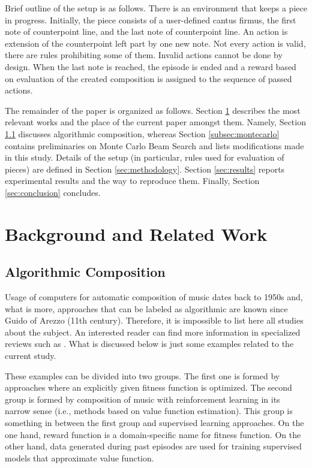 \documentclass{article}
\begin{document}
Brief outline of the setup is as follows. There is an environment that keeps a piece in progress. Initially, the piece consists of a user-defined cantus firmus, the first note of counterpoint line, and the last note of counterpoint line. An action is extension of the counterpoint left part by one new note. Not every action is valid, there are rules prohibiting some of them. Invalid actions cannot be done by design. When the last note is reached, the episode is ended and a reward based on evaluation of the created composition is assigned to the sequence of passed actions.

The remainder of the paper is organized as follows. Section \ref{sec:literature} describes the most relevant works and the place of the current paper amongst them. Namely, Section \ref{subsec:composition} discusses algorithmic composition, whereas Section \ref{subsec:montecarlo} contains preliminaries on Monte Carlo Beam Search and lists modifications made in this study. Details of the setup (in particular, rules used for evaluation of pieces) are defined in Section \ref{sec:methodology}. Section \ref{sec:results} reports experimental results and the way to reproduce them. Finally, Section \ref{sec:conclusion} concludes.


\section{Background and Related Work}
\label{sec:literature}

\subsection{Algorithmic Composition}
\label{subsec:composition}

Usage of computers for automatic composition of music dates back to 1950s and, what is more, approaches that can be labeled as algorithmic are known since Guido of Arezzo (11th century). Therefore, it is impossible to list here all studies about the subject. An interested reader can find more information in specialized reviews such as \cite{fernandez2013ai}. What is discussed below is just some examples related to the current study.

These examples can be divided into two groups. The first one is formed by approaches where an explicitly given fitness function is optimized. The second group is formed by composition of music with reinforcement learning in its narrow sense (i.e., methods based on value function estimation). This group is something in between the first group and supervised learning approaches. On the one hand, reward function is a domain-specific name for fitness function. On the other hand, data generated during past episodes are used for training supervised models that approximate value function.
\end{document}

